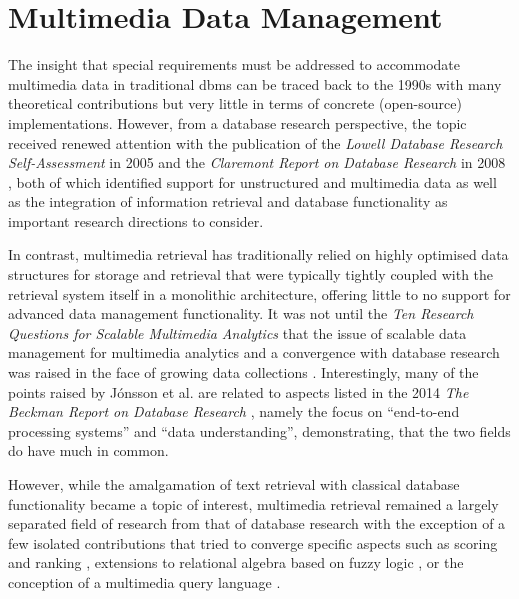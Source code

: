 \chapter{Multimedia Data Management}
\label{chapter:theory_multimedia_database}

The insight that special requirements must be addressed to accommodate multimedia data in traditional \acrshort{dbms} can be traced back to the 1990s \cite{Marcus:1996Foundations,Adjeroh:1997Multimedia} with many theoretical contributions but very little in terms of concrete (open-source) implementations. However, from a database research perspective, the topic received renewed attention with the publication of the \emph{Lowell Database Research Self-Assessment} in 2005 \cite{Abiteboul:2005Lowell} and the \emph{Claremont Report on Database Research} in 2008 \cite{Agrawal:2008Claremont}, both of which identified support for unstructured and multimedia data as well as the integration of information retrieval and database functionality as important research directions to consider.

In contrast, multimedia retrieval has traditionally relied on highly optimised data structures for storage and retrieval that were typically tightly coupled with the retrieval system itself in a monolithic architecture, offering little to no support for advanced data management functionality. It was not until the \emph{Ten Research Questions for Scalable Multimedia Analytics} \cite{Jonsson:2016Ten} that the issue of scalable data management for multimedia analytics and a convergence with database research was raised in the face of growing data collections \cite{Berns:2019V3C1,Rossetto:2021Insights}. Interestingly, many of the points raised by Jónsson et al. are related to aspects listed in the 2014 \emph{The Beckman Report on Database Research} \cite{Abadi:2014Beckman}, namely the focus on ``end-to-end processing systems'' and ``data understanding'', demonstrating, that the two fields do have much in common.

However, while the amalgamation of text retrieval with classical database functionality became a topic of interest, multimedia retrieval remained a largely separated field of research from that of database research with the exception of a few isolated contributions that tried to converge specific aspects such as scoring and ranking \cite{Chengkai:2005RankSQL,Zhang:2006Boolean}, extensions to relational algebra based on fuzzy logic \cite{Montesi:1999Similarity}, or the conception of a multimedia query language \cite{Budikova:2012Query}.

